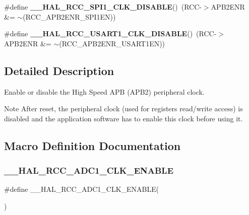 \begin{DoxyCompactItemize}
\item 
\mbox{\label{group___r_c_c___a_p_b2___clock___enable___disable_gaf2ccb5c6b63a60deb6463cbc629c10fe}} 
\#define {\bfseries \+\_\+\+\_\+\+H\+A\+L\+\_\+\+R\+C\+C\+\_\+\+S\+P\+I1\+\_\+\+C\+L\+K\+\_\+\+D\+I\+S\+A\+B\+LE}()~(R\+CC-\/$>$A\+P\+B2\+E\+NR \&= $\sim$(R\+C\+C\+\_\+\+A\+P\+B2\+E\+N\+R\+\_\+\+S\+P\+I1\+EN))
\item 
\mbox{\label{group___r_c_c___a_p_b2___clock___enable___disable_gae0050944298552e9f02f56ec8634f5a6}} 
\#define {\bfseries \+\_\+\+\_\+\+H\+A\+L\+\_\+\+R\+C\+C\+\_\+\+U\+S\+A\+R\+T1\+\_\+\+C\+L\+K\+\_\+\+D\+I\+S\+A\+B\+LE}()~(R\+CC-\/$>$A\+P\+B2\+E\+NR \&= $\sim$(R\+C\+C\+\_\+\+A\+P\+B2\+E\+N\+R\+\_\+\+U\+S\+A\+R\+T1\+EN))
\end{DoxyCompactItemize}


\subsection{Detailed Description}
Enable or disable the High Speed A\+PB (A\+P\+B2) peripheral clock. 

\begin{DoxyNote}{Note}
After reset, the peripheral clock (used for registers read/write access) is disabled and the application software has to enable this clock before using it. 
\end{DoxyNote}


\subsection{Macro Definition Documentation}
\mbox{\label{group___r_c_c___a_p_b2___clock___enable___disable_gaa28c08d39ba2ec206a131f0861d7c1a1}} 
\subsubsection{\texorpdfstring{\+\_\+\+\_\+\+H\+A\+L\+\_\+\+R\+C\+C\+\_\+\+A\+D\+C1\+\_\+\+C\+L\+K\+\_\+\+E\+N\+A\+B\+LE}{\_\_HAL\_RCC\_ADC1\_CLK\_ENABLE}}
{\footnotesize\ttfamily \#define \+\_\+\+\_\+\+H\+A\+L\+\_\+\+R\+C\+C\+\_\+\+A\+D\+C1\+\_\+\+C\+L\+K\+\_\+\+E\+N\+A\+B\+LE(\begin{DoxyParamCaption}{ }\end{DoxyParamCaption})}

